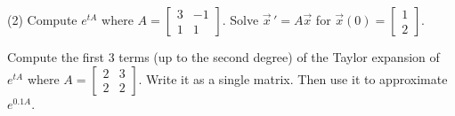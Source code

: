 \begin{exercise}
\pagebreak[2]
\leavevmode
\begin{tasks}(2)
\task
Compute
$e^{tA}$ where
$A=\left[ \begin{smallmatrix}
3 & -1 \\
1 & 1 
\end{smallmatrix}\right]$.
\task
Solve $\vec{x}\,' = A \vec{x}$
for $\vec{x}(0) =
\left[ \begin{smallmatrix}
1 \\ 2
\end{smallmatrix}\right]$.
\end{tasks}
\end{exercise}

\begin{exercise}
Compute the first 3 terms (up to the second degree) of the Taylor expansion of
$e^{tA}$ where
$A=\left[ \begin{smallmatrix}
2 & 3 \\
2 & 2 
\end{smallmatrix}\right]$.  Write it as a single matrix.
Then use it to approximate $e^{0.1A}$.
\end{exercise}

